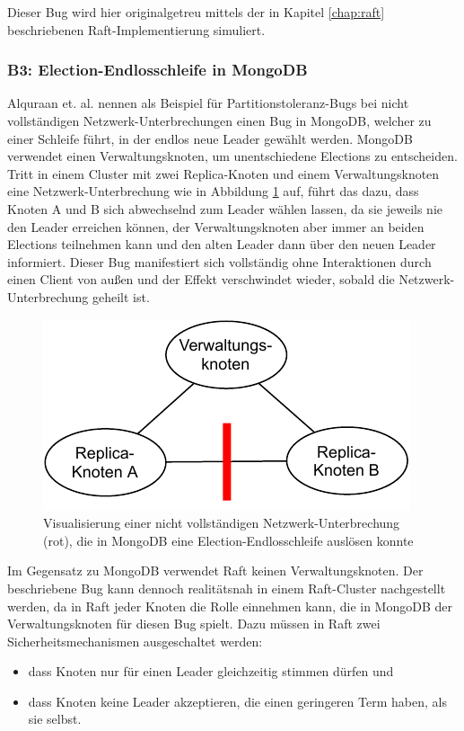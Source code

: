 \documentclass[12pt,a4paper]{report}
\begin{document}
Dieser Bug wird hier originalgetreu mittels der in Kapitel \ref{chap:raft} beschriebenen Raft-Implementierung simuliert.

\subsubsection{B3: Election-Endlosschleife in MongoDB}
Alquraan et. al. \cite{analysis_of_network_partition_failures} nennen als Beispiel für Partitionstoleranz-Bugs bei nicht
vollständigen Netzwerk-Unterbrechungen einen Bug in MongoDB, welcher zu einer Schleife führt, in der endlos neue Leader gewählt
werden. MongoDB verwendet einen Verwaltungsknoten, um unentschiedene Elections zu entscheiden.  Tritt in einem Cluster mit zwei
Replica-Knoten und einem Verwaltungsknoten eine Netzwerk-Unterbrechung wie in Abbildung \ref{fig:partial_partition_mongo} auf,
führt das dazu, dass Knoten A und B sich abwechselnd zum Leader wählen lassen, da sie jeweils nie den Leader erreichen können, der
Verwaltungsknoten aber immer an beiden Elections teilnehmen kann und den alten Leader dann über den neuen Leader informiert.
Dieser Bug manifestiert sich vollständig ohne Interaktionen durch einen Client von außen und der Effekt verschwindet wieder,
sobald die Netzwerk-Unterbrechung geheilt ist.

\begin{figure}[H]
	\centering
	\includegraphics[width=0.6\linewidth]{img/ditm-Partitions.pdf}
	\caption[Visualisierung einer Netzwerk-Unterbrechung, die in MongoDB eine Election-Endlosschleife auslösen kann]{Visualisierung einer nicht vollständigen Netzwerk-Unterbrechung (rot), die in MongoDB eine Election-Endlosschleife auslösen konnte}
	\label{fig:partial_partition_mongo}
\end{figure}

Im Gegensatz zu MongoDB verwendet Raft keinen Verwaltungsknoten. Der beschriebene Bug kann dennoch realitätsnah in einem
Raft-Cluster nachgestellt werden, da in Raft jeder Knoten die Rolle einnehmen kann, die in MongoDB der Verwaltungsknoten für diesen
Bug spielt. Dazu müssen in Raft zwei Sicherheitsmechanismen ausgeschaltet werden:
\begin{itemize}
	\item dass Knoten nur für einen Leader gleichzeitig stimmen dürfen und
	\item dass Knoten keine Leader akzeptieren, die einen geringeren Term haben, als sie selbst.
\end{itemize}
\end{document}
